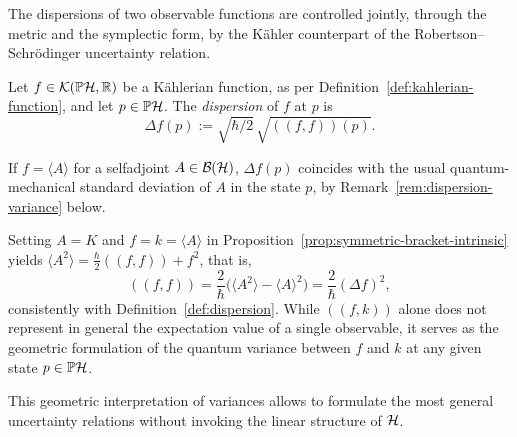 \noindent The dispersions of two observable functions are controlled jointly, through the metric and the symplectic form, by the Kähler counterpart of the Robertson--Schrödinger uncertainty relation.
 
\begin{definition}[Dispersion]
	\label{def:dispersion}
	Let $f\in\mathcal K(\PH,\R)$ be a Kählerian function, as per Definition~\ref{def:kahlerian-function}, and let $p\in\PH$. The \emph{dispersion} of $f$ at $p$ is
	\begin{equation}
		\Delta f(p) := \sqrt{\hbar/2}\,\sqrt{((f,f))(p)}.\label{eq:riemann-dispersion}
	\end{equation}
\end{definition}
	If $f=\langle A\rangle$ for a selfadjoint $A\in\BH$, $\Delta f(p)$ coincides with the usual quantum-mechanical standard deviation of $A$ in the state $p$, by Remark~\ref{rem:dispersion-variance} below.
\begin{remark}
	\label{rem:dispersion-variance}
	Setting $A=K$ and $f=k=\langle A\rangle$ in Proposition~\ref{prop:symmetric-bracket-intrinsic} yields $\langle A^2\rangle = \frac{\hbar}{2}((f,f))+ f^2$, that is,
	\begin{equation}
		\label{eq:riemann-bracket-variance}
		((f,f)) = \frac{2}{\hbar}\Big(\langle A^2 \rangle - \langle A \rangle^2\Big) = \frac{2}{\hbar}(\Delta f)^2,
	\end{equation}
	consistently with Definition~\ref{def:dispersion}. While $((f,k))$ alone does not represent in general the expectation value of a single observable, it serves as the geometric formulation of the quantum variance between $f$ and $k$ at any given state $p \in \PH$.
\end{remark}

This geometric interpretation of variances allows to formulate the most general uncertainty relations without invoking the linear structure of $\H$.

